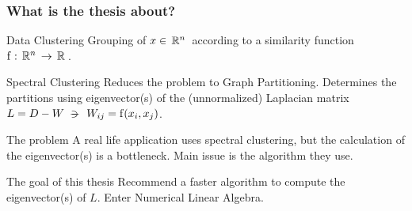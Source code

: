\begin{frame}
  \frametitle{What is the thesis about?}
  \begin{block}{Data Clustering}
    Grouping of $x \in \,\mathbb{R}^{n}\,$ according to a similarity function $\operatorname{f}: \,\mathbb{R}^{n}\, \rightarrow \,\mathbb{R}^{}\,$.
  \end{block}
  \begin{block}{Spectral Clustering}
    Reduces the problem to Graph Partitioning. Determines the partitions using eigenvector(s) of the (unnormalized) Laplacian matrix $L = D - W \suchthat W_{ij} = \func{f}(x_i,x_j)$.
  \end{block}
  \begin{block}{The problem}
    A real life application uses spectral clustering, but the calculation of the eigenvector(s) is a bottleneck. Main issue is the algorithm they use.
  \end{block}
  \begin{block}{The goal of this thesis}
    Recommend a faster algorithm to compute the eigenvector(s) of $L$. Enter Numerical Linear Algebra.
  \end{block}    
\end{frame}

